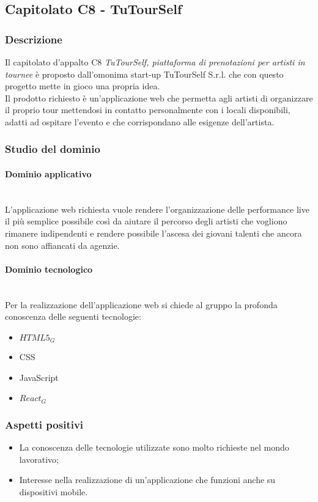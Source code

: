 	\subsection{Capitolato C8 - TuTourSelf}
		\subsubsection{Descrizione}
		Il capitolato d'appalto C8 \emph{TuTourSelf, piattaforma di prenotazioni per artisti in tournee} è proposto dall'omonima start-up TuTourSelf S.r.l. che con questo progetto mette in gioco una propria idea.\\ Il prodotto richiesto è un'applicazione web che permetta agli artisti di organizzare il proprio tour mettendosi in contatto personalmente con i locali disponibili, adatti ad ospitare l'evento e che corrispondano alle esigenze dell'artista. 
		\subsubsection{Studio del dominio}
			\paragraph{Dominio applicativo}
			\mbox{}\\
			L'applicazione web richiesta vuole rendere l’organizzazione delle performance live il più semplice possibile così da aiutare il percorso degli artisti che vogliono rimanere indipendenti e rendere possibile l'ascesa dei giovani talenti che ancora non sono affiancati da agenzie.
			\paragraph{Dominio tecnologico}
			\mbox{}\\
			Per la realizzazione dell'applicazione web si chiede al gruppo la profonda conoscenza delle seguenti tecnologie:
			\begin{itemize}
				\item $HTML5_G$
				\item CSS
				\item JavaScript
				\item $React_G$
			\end{itemize}
		\subsubsection{Aspetti positivi}
		\begin{itemize}
			\item La conoscenza delle tecnologie utilizzate sono molto richieste nel mondo lavorativo;
			\item Interesse nella realizzazione di un'applicazione che funzioni anche su dispositivi mobile.
		\end{itemize}
